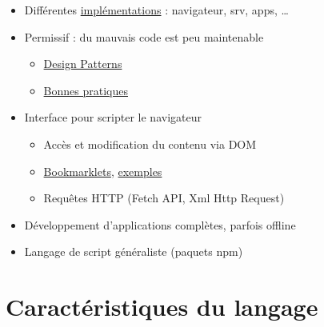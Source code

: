 \begin{itemize}
\tightlist
\item
  Différentes
  \href{https://en.wikipedia.org/wiki/List_of_ECMAScript_engines}{implémentations}
  : navigateur, srv, apps, \ldots{}
\item
  Permissif : du mauvais code est peu maintenable

  \begin{itemize}
  \tightlist
  \item
    \href{https://addyosmani.com/resources/essentialjsdesignpatterns/book/}{Design
    Patterns}
  \item
    \href{http://jstherightway.org/}{Bonnes pratiques}
  \end{itemize}
\item
  Interface pour scripter le navigateur

  \begin{itemize}
  \tightlist
  \item
    Accès et modification du contenu via DOM
  \item
    \href{http://www.howtogeek.com/125846/the-most-useful-bookmarklets-to-enhance-your-browsing-experience/}{Bookmarklets},
    \href{http://www.hongkiat.com/blog/100-useful-bookmarklets-for-better-productivity-ultimate-list/}{exemples}
  \item
    Requêtes HTTP (Fetch API, Xml Http Request)
  \end{itemize}
\item
  Développement d'applications complètes, parfois offline
\item
  Langage de script généraliste (paquets npm)
\end{itemize}

\hypertarget{caractuxe9ristiques-du-langage}{%
\section{Caractéristiques du
langage}\label{caractuxe9ristiques-du-langage}}

